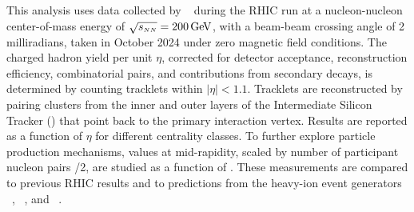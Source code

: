 This analysis uses data collected by \sphenix~\cite{PHENIX:2015siv, Belmont:2023fau} during the RHIC \auau run at a nucleon-nucleon center-of-mass energy of $\mbox{$\sqrt{s_{\scriptscriptstyle NN}}$}=200\mathrm{\,Ge\kern -0.1em V}$, with a beam-beam crossing angle of 2 milliradians, taken in October 2024 under zero magnetic field conditions. The charged hadron yield per unit $\eta$, corrected for detector acceptance, reconstruction efficiency, combinatorial pairs, and contributions from secondary decays, is determined by counting tracklets within $|\eta|<1.1$. Tracklets are reconstructed by pairing clusters from the inner and outer layers of the Intermediate Silicon Tracker (\intt) that point back to the primary interaction vertex. Results are reported as a function of $\eta$ for different \auau centrality classes. To further explore particle production mechanisms, \dndeta values at mid-rapidity, scaled by number of participant nucleon pairs \npart/2, are studied as a function of \npart. These measurements are compared to previous RHIC results and to predictions from the heavy-ion event generators \hijing~\cite{Wang:1991hta}, \ampt~\cite{Lin:2004en}, and \epos~\cite{Pierog:2013ria}.